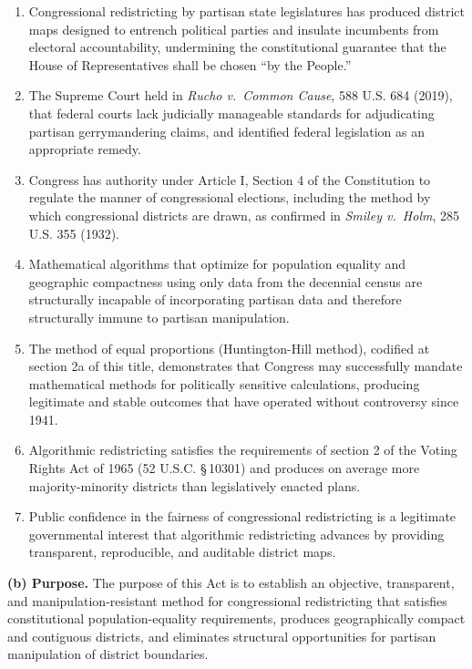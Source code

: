 \begin{enumerate}[label=(\arabic*)]
    \item Congressional redistricting by partisan state legislatures has produced district maps designed to entrench political parties and insulate incumbents from electoral accountability, undermining the constitutional guarantee that the House of Representatives shall be chosen ``by the People.''

    \item The Supreme Court held in \textit{Rucho v.\ Common Cause}, 588 U.S. 684 (2019), that federal courts lack judicially manageable standards for adjudicating partisan gerrymandering claims, and identified federal legislation as an appropriate remedy.

    \item Congress has authority under Article I, Section 4 of the Constitution to regulate the manner of congressional elections, including the method by which congressional districts are drawn, as confirmed in \textit{Smiley v.\ Holm}, 285 U.S. 355 (1932).

    \item Mathematical algorithms that optimize for population equality and geographic compactness using only data from the decennial census are structurally incapable of incorporating partisan data and therefore structurally immune to partisan manipulation.

    \item The method of equal proportions (Huntington-Hill method), codified at section 2a of this title, demonstrates that Congress may successfully mandate mathematical methods for politically sensitive calculations, producing legitimate and stable outcomes that have operated without controversy since 1941.

    \item Algorithmic redistricting satisfies the requirements of section 2 of the Voting Rights Act of 1965 (52 U.S.C. \S\,10301) and produces on average more majority-minority districts than legislatively enacted plans.

    \item Public confidence in the fairness of congressional redistricting is a legitimate governmental interest that algorithmic redistricting advances by providing transparent, reproducible, and auditable district maps.
\end{enumerate}

\textbf{(b) Purpose.} The purpose of this Act is to establish an objective, transparent, and manipulation-resistant method for congressional redistricting that satisfies constitutional population-equality requirements, produces geographically compact and contiguous districts, and eliminates structural opportunities for partisan manipulation of district boundaries.

